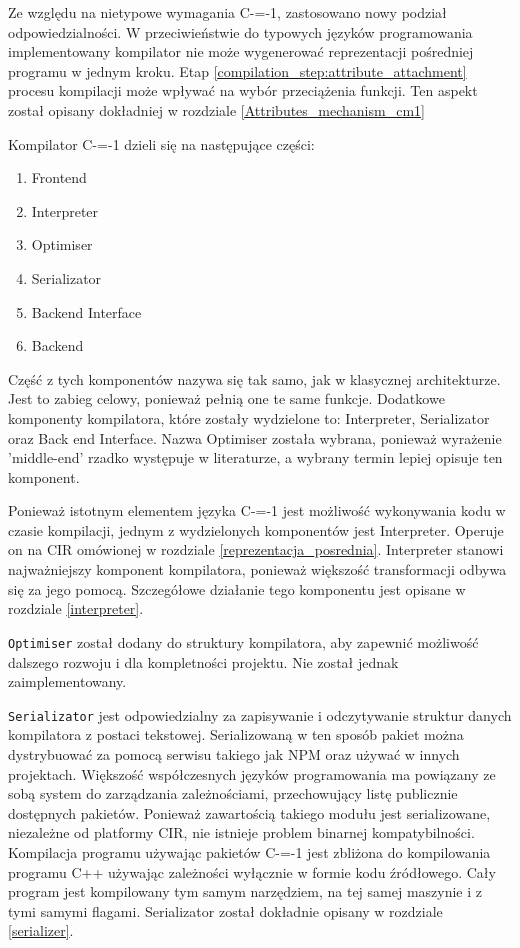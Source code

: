 Ze względu na nietypowe wymagania C-=-1, zastosowano nowy podział odpowiedzialności.
W przeciwieństwie do typowych języków programowania implementowany kompilator nie może wygenerować reprezentacji pośredniej programu w jednym kroku.
Etap \ref{compilation_step:attribute_attachment} procesu kompilacji może wpływać na wybór przeciążenia funkcji.
Ten aspekt został opisany dokładniej w rozdziale \ref{Attributes_mechanism_cm1}

Kompilator C-=-1 dzieli się na następujące części:
\begin{enumerate}
    \item Frontend
    \item Interpreter
    \item Optimiser
    \item Serializator
    \item Backend Interface
    \item Backend
\end{enumerate}
Część z tych komponentów nazywa się tak samo, jak w klasycznej architekturze. Jest to zabieg celowy, ponieważ pełnią one te same funkcje. 
Dodatkowe komponenty kompilatora, które zostały wydzielone to: Interpreter, Serializator oraz Back end Interface. %
Nazwa Optimiser została wybrana, ponieważ wyrażenie 'middle-end' rzadko występuje w literaturze, a wybrany termin lepiej opisuje ten komponent.

Ponieważ istotnym elementem języka C-=-1 jest możliwość wykonywania kodu w czasie kompilacji, jednym z wydzielonych komponentów jest Interpreter.
Operuje on na CIR omówionej w rozdziale \ref{reprezentacja_posrednia}. Interpreter stanowi najważniejszy komponent kompilatora, ponieważ większość transformacji odbywa się za jego pomocą. Szczegółowe działanie tego komponentu jest opisane w rozdziale \ref{interpreter}.

\lstinline{Optimiser} został dodany do struktury kompilatora, aby zapewnić możliwość dalszego rozwoju i dla kompletności projektu. Nie został jednak zaimplementowany.

\lstinline{Serializator} jest odpowiedzialny za zapisywanie i odczytywanie struktur danych kompilatora z postaci tekstowej.
Serializowaną w ten sposób pakiet można dystrybuować za pomocą serwisu takiego jak NPM \cite{npm} oraz używać w innych projektach.
Większość współczesnych języków programowania ma powiązany ze sobą system do zarządzania zależnościami, przechowujący listę publicznie dostępnych pakietów.
Ponieważ zawartością takiego modułu jest serializowane, niezależne od platformy CIR, nie istnieje problem binarnej kompatybilności.
Kompilacja programu używając pakietów C-=-1 jest zbliżona do kompilowania programu C++ używając zależności wyłącznie w formie kodu źródłowego.
Cały program jest kompilowany tym samym narzędziem, na tej samej maszynie i z tymi samymi flagami. Serializator został dokładnie opisany w rozdziale \ref{serializer}.


